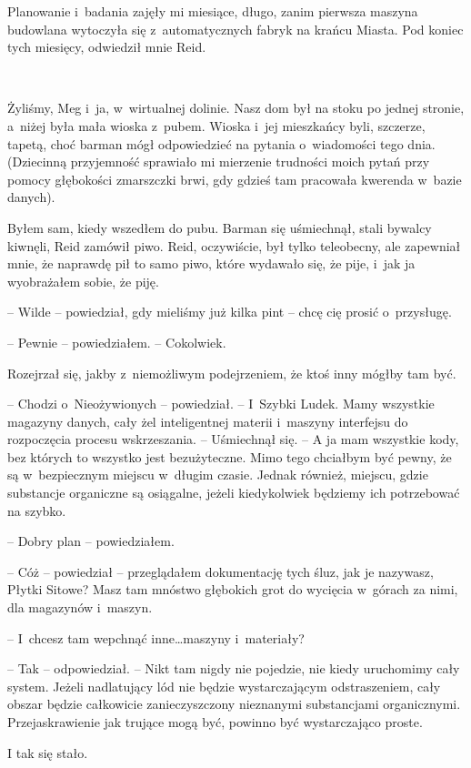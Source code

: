 \documentclass[oneside,polish,11pt,sfheadings]{mwbk}
\begin{document}
Planowanie i~badania zajęły mi miesiące, długo, zanim pierwsza maszyna
budowlana wytoczyła się z~automatycznych fabryk na krańcu Miasta. Pod
koniec tych miesięcy, odwiedził mnie Reid.

~

Żyliśmy, Meg i~ja, w~wirtualnej dolinie. Nasz dom był na stoku po jednej
stronie, a~niżej była mała wioska z~pubem. Wioska i~jej mieszkańcy byli,
szczerze, tapetą, choć barman mógł odpowiedzieć na pytania o~wiadomości
tego dnia. (Dziecinną przyjemność sprawiało mi mierzenie trudności moich
pytań przy pomocy głębokości zmarszczki brwi, gdy gdzieś tam pracowała
kwerenda w~bazie danych).

Byłem sam, kiedy wszedłem do pubu. Barman się uśmiechnął, stali bywalcy
kiwnęli, Reid zamówił piwo. Reid, oczywiście, był tylko teleobecny, ale
zapewniał mnie, że naprawdę pił to samo piwo, które wydawało się, że
pije, i~jak ja wyobrażałem sobie, że piję.

-- Wilde -- powiedział, gdy mieliśmy już kilka pint -- chcę cię prosić o~przysługę.

-- Pewnie -- powiedziałem. -- Cokolwiek.

Rozejrzał się, jakby z~niemożliwym podejrzeniem, że ktoś inny mógłby tam
być.

-- Chodzi o~Nieożywionych -- powiedział. -- I~Szybki Ludek. Mamy wszystkie
magazyny danych, cały żel inteligentnej materii i~maszyny interfejsu do
rozpoczęcia procesu wskrzeszania. -- Uśmiechnął się. -- A ja mam wszystkie
kody, bez których to wszystko jest bezużyteczne. Mimo tego chciałbym być
pewny, że są w~bezpiecznym miejscu w~długim czasie. Jednak również,
miejscu, gdzie substancje organiczne są osiągalne, jeżeli kiedykolwiek
będziemy ich potrzebować na szybko.

-- Dobry plan -- powiedziałem.

-- Cóż -- powiedział -- przeglądałem dokumentację tych śluz, jak je
nazywasz, Płytki Sitowe? Masz tam mnóstwo głębokich grot do wycięcia w~górach za nimi, dla magazynów i~maszyn.

-- I~chcesz tam wepchnąć inne\ldots maszyny i~materiały?

-- Tak -- odpowiedział. -- Nikt tam nigdy nie pojedzie, nie kiedy
uruchomimy cały system. Jeżeli nadlatujący lód nie będzie wystarczającym
odstraszeniem, cały obszar będzie całkowicie zanieczyszczony nieznanymi
substancjami organicznymi. Przejaskrawienie jak trujące mogą być,
powinno być wystarczająco proste.

I tak się stało.
\end{document}

